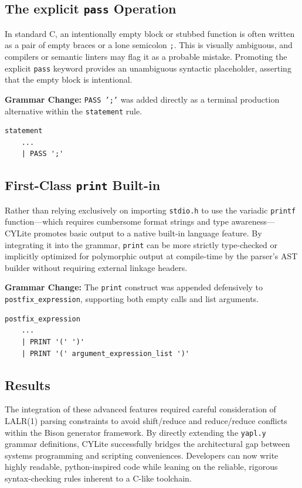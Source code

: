 \documentclass[a4paper,12pt]{article}
\begin{document}
\subsection{The explicit \texttt{pass} Operation}

In standard C, an intentionally empty block or stubbed function is often written as a pair of empty braces or a lone semicolon \texttt{;}. This is visually ambiguous, and compilers or semantic linters may flag it as a probable mistake. Promoting the explicit \texttt{pass} keyword provides an unambiguous syntactic placeholder, asserting that the empty block is intentional.

\textbf{Grammar Change:} \texttt{PASS ';'} was added directly as a terminal production alternative within the \texttt{statement} rule.

\begin{lstlisting}
statement
    ...
    | PASS ';'
\end{lstlisting}

\subsection{First-Class \texttt{print} Built-in}

Rather than relying exclusively on importing \texttt{stdio.h} to use the variadic \texttt{printf} function—which requires cumbersome format strings and type awareness—CYLite promotes basic output to a native built-in language feature. By integrating it into the grammar, \texttt{print} can be more strictly type-checked or implicitly optimized for polymorphic output at compile-time by the parser's AST builder without requiring external linkage headers.

\textbf{Grammar Change:} The \texttt{print} construct was appended defensively to \texttt{postfix\_expression}, supporting both empty calls and list arguments.

\begin{lstlisting}
postfix_expression
    ...
    | PRINT '(' ')'
    | PRINT '(' argument_expression_list ')'
\end{lstlisting}

\subsection{Results}
The integration of these advanced features required careful consideration of LALR(1) parsing constraints to avoid shift/reduce and reduce/reduce conflicts within the Bison generator framework. By directly extending the \texttt{yapl.y} grammar definitions, CYLite successfully bridges the architectural gap between systems programming and scripting conveniences. Developers can now write highly readable, python-inspired code while leaning on the reliable, rigorous syntax-checking rules inherent to a C-like toolchain.
\end{document}
